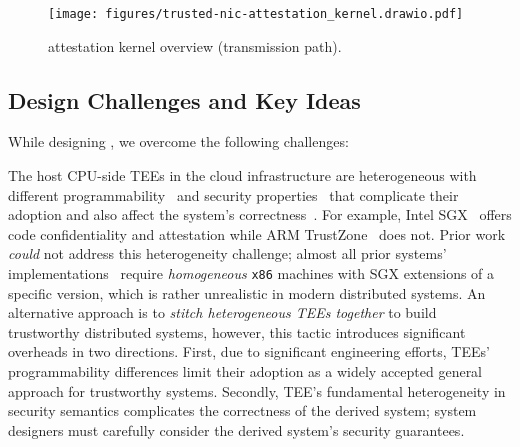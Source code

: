 \begin{figure}[t!]
    \centering
    \texttt{[image: figures/trusted-nic-attestation\_kernel.drawio.pdf]}
    \caption{\trustedfpga{} attestation kernel overview (transmission path).}
    \label{fig:attestation_kernel}
\end{figure}    
\fi



\subsection{Design Challenges and Key Ideas} \label{subsec:challenges} While designing \projecttitle{}, we overcome the following challenges:





The host CPU-side TEEs in the cloud infrastructure are heterogeneous with different programmability~\cite{Baumann2014, scone, 10.1145/3079856.3080208, 10.1145/3460120.3485341, tsai2017graphene, Rkt-io} and security properties~\cite{10.1145/3600160.3600169, 7807249, 10.1007/978-3-031-16092-9_7} that complicate their adoption and also affect the system's correctness~\cite{10.1145/3460120.3485341}. For example, Intel SGX~\cite{cryptoeprint:2016:086} offers code confidentiality and attestation while ARM TrustZone~\cite{arm-realm} does not. Prior work {\em could} not address this heterogeneity challenge; almost all prior systems' implementations~\cite{hybster, 10.1145/3492321.3519568, minBFT, DBLP:journals/corr/LiuLKA16a} require {\em homogeneous} {\tt x86} machines with SGX extensions of a specific version, which is rather unrealistic in modern distributed systems. 
An alternative approach is to {\em stitch heterogeneous TEEs together} to build trustworthy distributed systems, however, this tactic introduces significant overheads in two directions. First, due to significant engineering efforts, TEEs'  {programmability differences limit} their adoption as a widely accepted general approach for trustworthy systems. Secondly, TEE's fundamental heterogeneity in {security semantics} complicates the correctness of the derived system; system designers must carefully consider the derived system's security guarantees.

